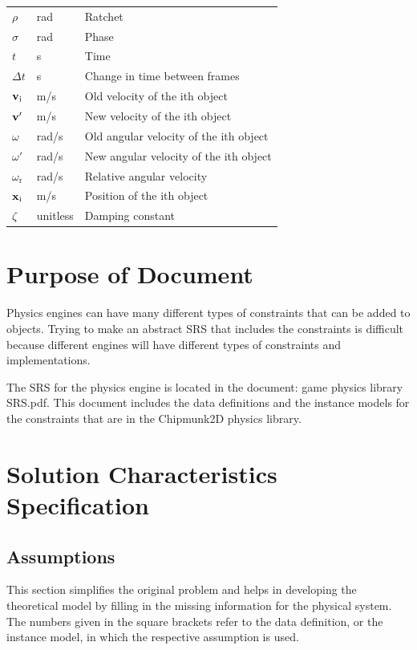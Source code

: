 \documentclass[12pt]{article}
\begin{document}
\begin{longtable}{l l p{12cm}}
  $\rho $ & \si[per-mode=symbol]{\radian}   & Ratchet
  \\ 
  $\sigma $ & \si[per-mode=symbol]{\radian}    & Phase
  \\ 
  $t$ & \si[per-mode=symbol] {\second}   &Time
  \\ 
  $\Delta t$ & \si[per-mode=symbol] {\second}   &Change in time between frames
  \\ 
$\bf{v}_\text{i}$ & \si[per-mode=symbol] {\metre\per\second} &Old velocity of
the ith object
  \\ 
$\bf{v'}$ & \si[per-mode=symbol] {\metre\per\second} &New velocity of the ith
object
  \\ 
${\omega}$ & \si[per-mode=symbol] {\radian\per\second} &Old angular velocity of
the ith object
  \\ 
${\omega'}$ & \si[per-mode=symbol] {\radian\per\second} &New angular velocity of
the ith object
  \\ 
${\omega_\text{r}}$ & \si[per-mode=symbol] {\radian\per\second} & Relative
angular velocity
  \\ 
$\bf{x}_\text{i}$ & \si[per-mode=symbol] {\metre\per\second} &Position of the
ith object
  \\ 
  $\zeta$ & unitless  &Damping constant
  \\ 
  \bottomrule
\end{longtable}
\section{Purpose of Document}
Physics engines can have many different types of constraints 
that can be added to objects. Trying to make an abstract SRS
that includes the constraints is difficult because different
engines will have different types of constraints and implementations.

The SRS for the physics engine is located in the document: 
game physics library SRS.pdf. This document includes the 
data definitions and the instance models for the constraints
that are in the Chipmunk2D physics library.

\section{Solution Characteristics Specification} 

\subsection{Assumptions}
This section simplifies the original problem and helps in developing the
theoretical model by filling in the missing information for the physical
system. The numbers given in the square brackets refer to the data definition,
or the instance model, in which the respective assumption is used.
\end{document}
